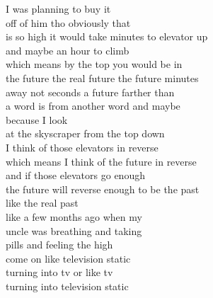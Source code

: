\begin{flushleft}
\begin{paracol}{3}
I was planning to buy it\\
off of him tho obviously that\\
is so high it would take minutes to elevator up\\ %
and maybe an hour to climb\\
which means by the top you would be in\\
the future the real future the future minutes\\
away not seconds a future farther than\\
a word is from another word and maybe\\
because I look\\
at the skyscraper from the top down\\
I think of those elevators in reverse\\
which means I think of the future in reverse\\
and if those elevators go enough\\
the future will reverse enough to be the past\\
like the real past\\
like a few months ago when my\\
uncle was breathing and taking\\
pills and feeling the high\\
come on like television static\\
turning into tv or like tv\\
turning into television static
\end{paracol}
\end{flushleft}